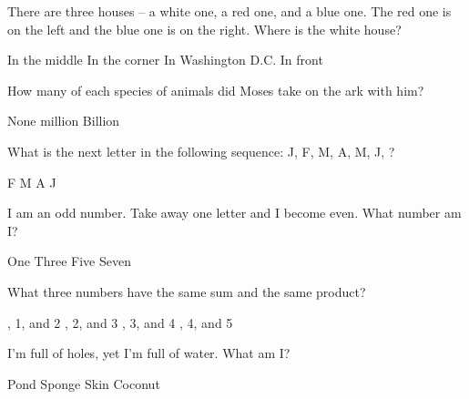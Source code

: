 \begin{questions}
\question There are three houses -- a white one, a red one, and a blue one. The red one is on the left and the blue one is on the right. Where is the white house?
\begin{multicols}{2}
\begin{choices}  
\choice In the middle 
\choice In the corner 
\CorrectChoice In Washington D.C.
\choice In front 
\end{choices}
\end{multicols} 

\question How many of each species of animals did Moses take on the ark with him?
\begin{multicols}{4}
\begin{choices}  
\CorrectChoice None 
 million 
 Billion  
\end{choices}
\end{multicols}

\question What is the next letter in the following sequence: J, F, M, A, M, J, \blank?
\begin{multicols}{4}
\begin{choices}  
\choice F
\choice M
\choice A
\CorrectChoice J
\end{choices}
\end{multicols}

\question I am an odd number. Take away one letter and I become even. What number am I?   
\begin{multicols}{4}
\begin{choices}  
\choice One
\choice Three
\choice Five
\CorrectChoice Seven
\end{choices}
\end{multicols} 

\question What three numbers have the same sum and the same product?
\begin{multicols}{4}
\begin{choices}  
, 1, and 2 
, 2, and 3
, 3, and 4
, 4, and 5 
\end{choices}
\end{multicols} 

\question I'm full of holes, yet I'm full of water. What am I?
\begin{multicols}{4}
\begin{choices}  
\choice Pond
\CorrectChoice Sponge
\choice Skin
\choice Coconut 
\end{choices}
\end{multicols} 


\end{questions}
